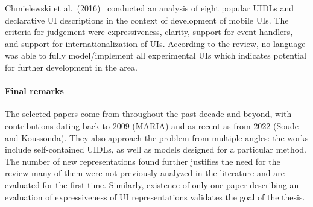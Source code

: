 Chmielewski et al.\ (2016)~\cite{Chmielewski2016} conducted an analysis of eight popular UIDLs and declarative UI descriptions in the context of development of mobile UIs.
The criteria for judgement were expressiveness, clarity, support for event handlers, and support for internationalization of UIs.
According to the review, no language was able to fully model/implement all experimental UIs which indicates potential for further development in the area.

\paragraph{Final remarks}

The selected papers come from throughout the past decade and beyond, with contributions dating back to 2009 (MARIA) and as recent as from 2022 (Soude and Koussonda).
They also approach the problem from multiple angles: the works include self-contained UIDLs, as well as models designed for a particular method.
The number of new representations found further justifies the need for the review\,\textendash\,many of them were not previously analyzed in the literature and are evaluated for the first time.
Similarly, existence of only one paper describing an evaluation of expressiveness of UI representations validates the goal of the thesis.
